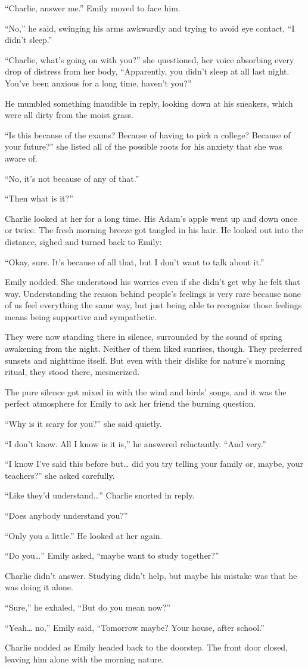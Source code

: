 “Charlie, answer me.” Emily moved to face him.

“No,” he said, swinging his arms awkwardly and trying to avoid eye contact, “I didn't sleep.”

“Charlie, what's going on with you?” she questioned, her voice absorbing every drop of distress from her body, “Apparently, you didn't sleep at all last night. You've been anxious for a long time, haven't you?”

He mumbled something inaudible in reply, looking down at his sneakers, which were all dirty from the moist grass.

“Is this because of the exams? Because of having to pick a college? Because of your future?” she listed all of the possible roots for his anxiety that she was aware of.

“No, it's not because of any of that.”

“Then what is it?”

Charlie looked at her for a long time. His Adam's apple went up and down once or twice. The fresh morning breeze got tangled in his hair. He looked out into the distance, sighed and turned back to Emily:

“Okay, sure. It's because of all that, but I don't want to talk about it.”

Emily nodded. She understood his worries even if she didn't get why he felt that way. Understanding the reason behind people's feelings is very rare because none of us feel everything the same way, but just being able to recognize those feelings means being supportive and sympathetic.

They were now standing there in silence, surrounded by the sound of spring awakening from the night. Neither of them liked sunrises, though. They preferred sunsets and nighttime itself. But even with their dislike for nature's morning ritual, they stood there, mesmerized.

The pure silence got mixed in with the wind and birds' songs, and it was the perfect atmosphere for Emily to ask her friend the burning question.

“Why is it scary for you?” she said quietly.

“I don't know. All I know is it is,” he answered reluctantly. “And very.”

“I know I've said this before but… did you try telling your family or, maybe, your teachers?” she asked carefully.

“Like they'd understand…” Charlie snorted in reply.

“Does anybody understand you?”

“Only you a little.” He looked at her again.

“Do you…” Emily asked, “maybe want to study together?”

Charlie didn't answer. Studying didn't help, but maybe his mistake was that he was doing it alone.

“Sure,” he exhaled, “But do you mean now?”

“Yeah… no,” Emily said, “Tomorrow maybe? Your house, after school.”

Charlie nodded as Emily headed back to the doorstep. The front door closed, leaving him alone with the morning nature.